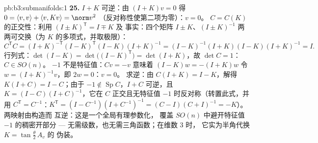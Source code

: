 \begin{solution}{pb:b3:submanifolds:1}
\textbf{25.} $I + K$ 可逆：由 $(I + K)v = 0$ 得 $0 =
\langle v, v\rangle + \langle v, Kv\rangle = \norm v^2$
（反对称性使第二项为零）：$v = 0$。
$C = C(K)$ 的正交性：利用 $(I \pm K)^{\mathsf T} = I \mp K$ 及
事实：四个矩阵 $I \pm K$、$(I \pm K)^{-1}$
两两可交换（为 $K$ 的多项式，并取极限）：
\[
C^{\mathsf T}C = (I + K)^{-\mathsf T}(I - K)^{\mathsf T}
(I - K)(I + K)^{-1}
= (I - K)^{-1}(I + K)(I - K)(I + K)^{-1} = I .
\]
行列式：$\det(I - K) = \det\bigl((I - K)^{\mathsf
T}\bigr) = \det(I + K)$，故 $\det C = 1$：$C \in SO(n)$。
$-1$ 不是特征值：$Cv = -v$ 意味着 $(I - K)w = -(I + K)w$
令 $w = (I + K)^{-1}v$，即 $2w = 0$：$v = 0$。
求逆：由 $C(I + K) = I - K$，解得 $K(I + C) = I -
C$；由于 $-1 \notin \operatorname{Sp}C$，$I + C$
可逆，且 $K = (I - C)(I + C)^{-1}$，它在
$C$ 正交且无特征值
$-1$ 时反对称（转置此式，并用 $C^{\mathsf T} =
C^{-1}$：$K^{\mathsf T} = (I - C^{-1})(I + C^{-1})^{-1} =
(C - I)(C + I)^{-1} = -K$）。两映射由构造而
互逆：这是一个全局有理参数化，
覆盖 $SO(n)$ 中避开特征值 $-1$ 的稠密开部分
--- 无需级数，也无需三角函数；在维数 $3$ 时，
它实为半角代换 $K = \tan\frac\theta2\,A_v$ 的
伪装。
\end{solution}
